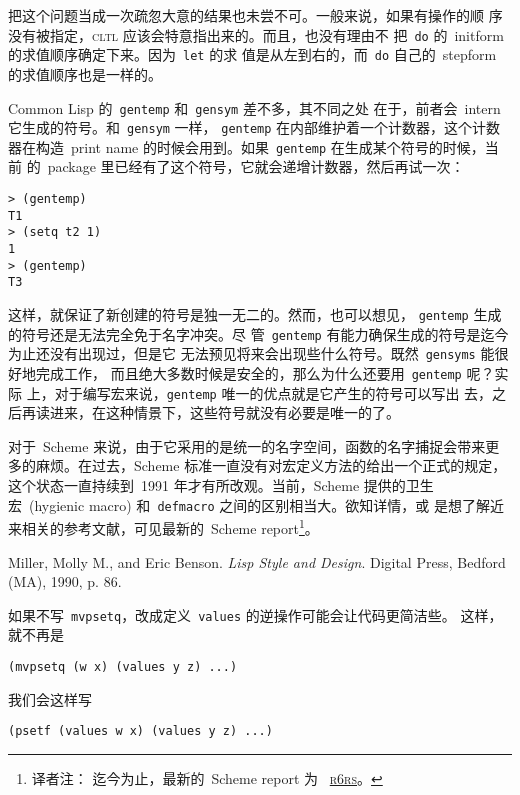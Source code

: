 \begin{notes}
  把这个问题当成一次疏忽大意的结果也未尝不可。一般来说，如果有操作的顺
  序没有被指定，\textsc{cltl} 应该会特意指出来的。而且，也没有理由不
  把~\texttt{do} 的~initform 的求值顺序确定下来。因为~\texttt{let} 的求
  值是从左到右的，而~\texttt{do} 自己的~stepform 的求值顺序也是一样的。


  Common Lisp 的~\texttt{gentemp} 和~\texttt{gensym} 差不多，其不同之处
  在于，前者会~intern 它生成的符号。和~\texttt{gensym} 一样，
  \texttt{gentemp} 在内部维护着一个计数器，这个计数器在构造~print
  name 的时候会用到。如果~\texttt{gentemp} 在生成某个符号的时候，当前
  的~package 里已经有了这个符号，它就会递增计数器，然后再试一次：

\begin{verbatim}
> (gentemp)
T1
> (setq t2 1)
1
> (gentemp)
T3
\end{verbatim}

这样，就保证了新创建的符号是独一无二的。然而，也可以想见，
\texttt{gentemp} 生成的符号还是无法完全免于名字冲突。尽
管~\texttt{gentemp} 有能力确保生成的符号是迄今为止还没有出现过，但是它
无法预见将来会出现些什么符号。既然~\texttt{gensyms} 能很好地完成工作，
而且绝大多数时候是安全的，那么为什么还要用~\texttt{gentemp} 呢？实际
上，对于编写宏来说，\texttt{gentemp} 唯一的优点就是它产生的符号可以写出
去，之后再读进来，在这种情景下，这些符号就没有必要是唯一的了。


对于~Scheme 来说，由于它采用的是统一的名字空间，函数的名字捕捉会带来更
多的麻烦。在过去，Scheme 标准一直没有对宏定义方法的给出一个正式的规定，
这个状态一直持续到~1991 年才有所改观。当前，Scheme 提供的卫生
宏~(hygienic macro) 和~\texttt{defmacro} 之间的区别相当大。欲知详情，或
是想了解近来相关的参考文献，可见最新的~Scheme report\footnote{译者注：
迄今为止，最新的~Scheme report 为
~\href{http://www.r6rs.org/}{\textsc{r6rs}}。}。


Miller, Molly M., and Eric Benson. \emph{Lisp Style and Design}.  Digital
Press, Bedford (MA), 1990, p. 86.  


如果不写~\texttt{mvpsetq}，改成定义~\texttt{values} 的逆操作可能会让代码更简洁些。
这样，就不再是
\begin{verbatim}
(mvpsetq (w x) (values y z) ...)
\end{verbatim} 
我们会这样写
\begin{verbatim}
(psetf (values w x) (values y z) ...)
\end{verbatim}


\end{notes}
